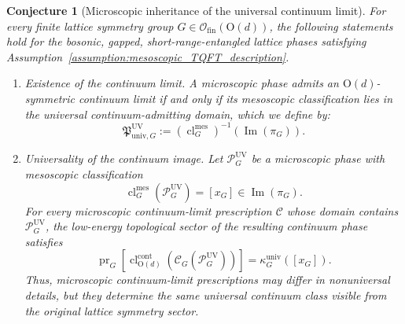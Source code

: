 \documentclass[aps,prx,reprint,superscriptaddress,twocolumn,amsmath,amssymb,amsfonts, nofootinbib]{revtex4-2}
\newcommand{\ofin}{\mathcal{O}_{\text{fin}}}
\theoremstyle{apsstyle}
\newtheorem{conjecture}[theorem]{Conjecture}
\begin{document}
\bigskip 

\begin{conjecture}[Microscopic inheritance of the universal continuum limit]
\label{conj:microscopic_obstruction_inheritance}
For every finite lattice symmetry group $G\in\ofin(\mathrm O(d))$, the following statements hold for the bosonic, gapped, short-range-entangled lattice phases satisfying Assumption~\ref{assumption:mesoscopic_TQFT_description}.
\begin{enumerate}
    \item[{\rm (i)}] \emph{Existence of the continuum limit.}
    A microscopic phase admits an $\mathrm{O}(d)$-symmetric continuum limit if and only if its mesoscopic classification lies in the universal continuum-admitting domain, which we define by:
    \begin{equation}
    \mathfrak P_{\mathrm{univ},G}^{\mathrm{UV}}
    :=
    \left(\operatorname{cl}^{\mathrm{mes}}_G \right)^{-1}
    \left(\operatorname{Im}(\pi_G)\right).
    \label{eq:microscopic_universal_domain}
    \end{equation}

    \item[{\rm (ii)}] \emph{Universality of the continuum image.}
    Let $\mathcal P_G^{\mathrm{UV}}$ be a microscopic phase with mesoscopic classification
    \begin{equation*}
    \operatorname{cl}^{\mathrm{mes}}_G
    \left( \mathcal P_G^{\mathrm{UV}} \right)
    = [x_G]\in\operatorname{Im}(\pi_G).
    \end{equation*}
    For every microscopic continuum-limit prescription $\mathcal C$ whose domain contains $\mathcal P_G^{\mathrm{UV}}$, the low-energy topological sector of the resulting continuum phase satisfies
    \begin{equation}
    \operatorname{pr}_G
    \left[\operatorname{cl}^{\mathrm{cont}}_{\mathrm{O}(d)}
    \left( \mathcal C_G(\mathcal P_G^{\mathrm{UV}})
    \right) \right] = \kappa_G^{\mathrm{univ}}([x_G]).
    \label{eq:microscopic_universal_image}
    \end{equation}
    Thus, microscopic continuum-limit prescriptions may differ in nonuniversal details, but they determine the same universal continuum class visible from the original lattice symmetry sector.
\end{enumerate}
\end{conjecture}
\bigskip
\end{document}
